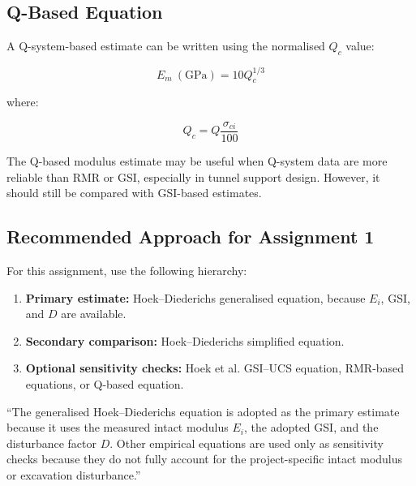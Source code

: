 \documentclass[a4paper,12pt]{article}
\begin{document}
\subsection{Q-Based Equation}

A Q-system-based estimate can be written using the normalised \(Q_c\) value:

\[
E_m~(\text{GPa}) =
10Q_c^{1/3}
\]

where:

\[
Q_c =
Q\frac{\sigma_{ci}}{100}
\]

\begin{notebox}
The Q-based modulus estimate may be useful when Q-system data are more reliable than
RMR or GSI, especially in tunnel support design. However, it should still be compared
with GSI-based estimates.
\end{notebox}

\subsection{Recommended Approach for Assignment 1}

For this assignment, use the following hierarchy:

\begin{enumerate}
    \item \textbf{Primary estimate:} Hoek--Diederichs generalised equation, because \(E_i\),
    GSI, and \(D\) are available.
    
    \item \textbf{Secondary comparison:} Hoek--Diederichs simplified equation.
    
    \item \textbf{Optional sensitivity checks:} Hoek et al. GSI--UCS equation,
    RMR-based equations, or Q-based equation.
\end{enumerate}

\begin{keybox}
``The generalised Hoek--Diederichs equation is adopted as the primary estimate because it
uses the measured intact modulus \(E_i\), the adopted GSI, and the disturbance factor
\(D\). Other empirical equations are used only as sensitivity checks because they do not
fully account for the project-specific intact modulus or excavation disturbance.''
\end{keybox}
\end{document}
